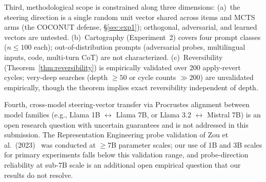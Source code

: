 \documentclass{article}
\begin{document}
Third, methodological scope is constrained along three dimensions: (a)~the steering direction is a single random unit vector shared across items and MCTS arms (the COCONUT defense, §\ref{sec:exp1}); orthogonal, adversarial, and learned vectors are untested. (b)~Cartography (Experiment~2) covers four prompt classes ($n \le 100$ each); out-of-distribution prompts (adversarial probes, multilingual inputs, code, multi-turn CoT) are not characterized. (c)~Reversibility (Theorem~\ref{thm:reversibility}) is empirically validated over 200 apply-revert cycles; very-deep searches (depth $\ge 50$ or cycle counts $\gg 200$) are unvalidated empirically, though the theorem implies exact reversibility independent of depth.

Fourth, cross-model steering-vector transfer via Procrustes alignment between model families (e.g., Llama 1B $\leftrightarrow$ Llama 7B, or Llama 3.2 $\leftrightarrow$ Mistral 7B) is an open research question with uncertain guarantees and is not addressed in this submission. The Representation Engineering probe validation of Zou et al.\ (2023)~\cite{zou2023repe} was conducted at $\ge 7$B parameter scales; our use of 1B and 3B scales for primary experiments falls below this validation range, and probe-direction reliability at sub-7B scale is an additional open empirical question that our results do not resolve.
\label{sec:limitations}
\end{document}
